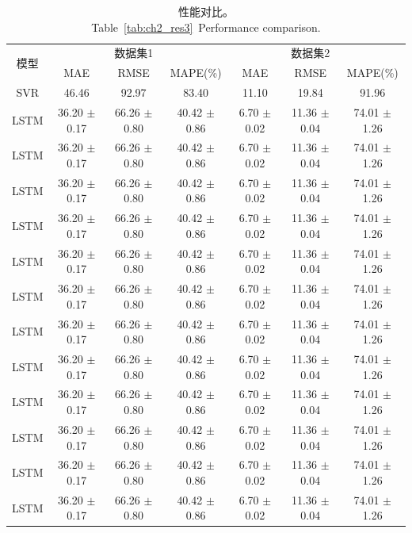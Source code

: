 \begin{table}
	\setlength\tabcolsep{20pt} %
	\caption{性能对比。\\Table~\ref{tab:ch2_res3}~Performance comparison. }
	\begin{threeparttable}
		\begin{tabular}{c|ccc|ccc}
			\toprule
			\multirow{2}{*}{模型} &  & 数据集1 &  &  & 数据集2&  \\
			& MAE & RMSE & MAPE(\%) & MAE & RMSE & MAPE(\%) \\
			\midrule
			
			SVR & 46.46 & 92.97 & 83.40 & 11.10 & 19.84 & 91.96  \\
			LSTM & 36.20 $\pm$0.17 & 66.26 $\pm$0.80 & 40.42 $\pm$0.86 & 6.70 $\pm$0.02 & 11.36 $\pm$0.04 & 74.01 $\pm$1.26  \\
			LSTM & 36.20 $\pm$0.17 & 66.26 $\pm$0.80 & 40.42 $\pm$0.86 & 6.70 $\pm$0.02 & 11.36 $\pm$0.04 & 74.01 $\pm$1.26  \\
			LSTM & 36.20 $\pm$0.17 & 66.26 $\pm$0.80 & 40.42 $\pm$0.86 & 6.70 $\pm$0.02 & 11.36 $\pm$0.04 & 74.01 $\pm$1.26  \\
			LSTM & 36.20 $\pm$0.17 & 66.26 $\pm$0.80 & 40.42 $\pm$0.86 & 6.70 $\pm$0.02 & 11.36 $\pm$0.04 & 74.01 $\pm$1.26  \\
			LSTM & 36.20 $\pm$0.17 & 66.26 $\pm$0.80 & 40.42 $\pm$0.86 & 6.70 $\pm$0.02 & 11.36 $\pm$0.04 & 74.01 $\pm$1.26  \\
			LSTM & 36.20 $\pm$0.17 & 66.26 $\pm$0.80 & 40.42 $\pm$0.86 & 6.70 $\pm$0.02 & 11.36 $\pm$0.04 & 74.01 $\pm$1.26  \\
			LSTM & 36.20 $\pm$0.17 & 66.26 $\pm$0.80 & 40.42 $\pm$0.86 & 6.70 $\pm$0.02 & 11.36 $\pm$0.04 & 74.01 $\pm$1.26  \\
			LSTM & 36.20 $\pm$0.17 & 66.26 $\pm$0.80 & 40.42 $\pm$0.86 & 6.70 $\pm$0.02 & 11.36 $\pm$0.04 & 74.01 $\pm$1.26  \\
			LSTM & 36.20 $\pm$0.17 & 66.26 $\pm$0.80 & 40.42 $\pm$0.86 & 6.70 $\pm$0.02 & 11.36 $\pm$0.04 & 74.01 $\pm$1.26  \\
			LSTM & 36.20 $\pm$0.17 & 66.26 $\pm$0.80 & 40.42 $\pm$0.86 & 6.70 $\pm$0.02 & 11.36 $\pm$0.04 & 74.01 $\pm$1.26  \\
			LSTM & 36.20 $\pm$0.17 & 66.26 $\pm$0.80 & 40.42 $\pm$0.86 & 6.70 $\pm$0.02 & 11.36 $\pm$0.04 & 74.01 $\pm$1.26  \\		
			LSTM & 36.20 $\pm$0.17 & 66.26 $\pm$0.80 & 40.42 $\pm$0.86 & 6.70 $\pm$0.02 & 11.36 $\pm$0.04 & 74.01 $\pm$1.26  \\

\end{tabular}
\end{threeparttable}
\end{table}
